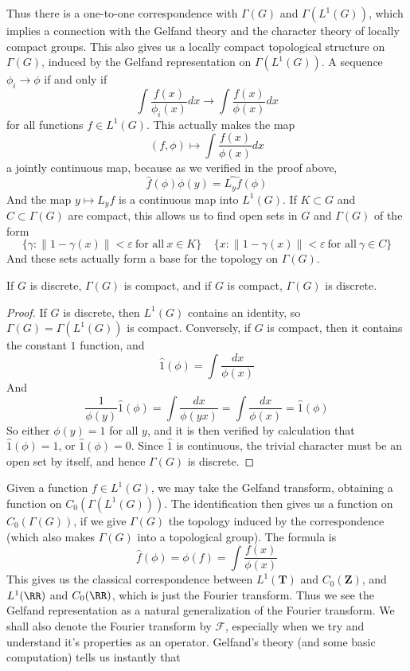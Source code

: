 Thus there is a one-to-one correspondence with $\Gamma(G)$ and $\Gamma(L^1(G))$, which implies a connection with the Gelfand theory and the character theory of locally compact groups. This also gives us a locally compact topological structure on $\Gamma(G)$, induced by the Gelfand representation on $\Gamma(L^1(G))$. A sequence $\phi_i \to \phi$ if and only if
%
\[ \int \frac{f(x)}{\phi_i(x)} dx \to \int \frac{f(x)}{\phi(x)} dx \]
%
for all functions $f \in L^1(G)$. This actually makes the map
%
\[ (f,\phi) \mapsto \int \frac{f(x)}{\phi(x)} dx \]
%
a jointly continuous map, because as we verified in the proof above,
%
\[ \widehat{f}(\phi) \phi(y) = \widehat{L_y f}(\phi) \]
%
And the map $y \mapsto L_y f$ is a continuous map into $L^1(G)$. If $K \subset G$ and $C \subset \Gamma(G)$ are compact, this allows us to find open sets in $G$ and $\Gamma(G)$ of the form
%
\[ \{ \gamma : \| 1 - \gamma(x) \| < \varepsilon\ \text{for all}\ x \in K \}\ \ \ \ \ \{ x : \| 1 - \gamma(x) \| < \varepsilon\ \text{for all}\ \gamma \in C \} \]
%
And these sets actually form a base for the topology on $\Gamma(G)$.

\begin{theorem}
    If $G$ is discrete, $\Gamma(G)$ is compact, and if $G$ is compact, $\Gamma(G)$ is discrete.
\end{theorem}
\begin{proof}
    If $G$ is discrete, then $L^1(G)$ contains an identity, so $\Gamma(G) = \Gamma(L^1(G))$ is compact. Conversely, if $G$ is compact, then it contains the constant $1$ function, and
    \[ \widehat{1}(\phi) = \int \frac{dx}{\phi(x)} \]
    And
    \[ \frac{1}{\phi(y)} \widehat{1}(\phi) = \int \frac{dx}{\phi(yx)} = \int \frac{dx}{\phi(x)} = \hat{1}(\phi) \]
    So either $\phi(y) = 1$ for all $y$, and it is then verified by calculation that $\widehat{1}(\phi) = 1$, or $\widehat{1}(\phi) = 0$. Since $\widehat{1}$ is continuous, the trivial character must be an open set by itself, and hence $\Gamma(G)$ is discrete.
\end{proof}

Given a function $f \in L^1(G)$, we may take the Gelfand transform, obtaining a function on $C_0(\Gamma(L^1(G)))$. The identification then gives us a function on $C_0(\Gamma(G))$, if we give $\Gamma(G)$ the topology induced by the correspondence (which also makes $\Gamma(G)$ into a topological group). The formula is
%
\[ \widehat{f}(\phi) = \phi(f) = \int \frac{f(x)}{\phi(x)} \]
%
This gives us the classical correspondence between $L^1(\mathbf{T})$ and $C_0(\mathbf{Z})$, and $L^1(\RR)$ and $C_0(\RR)$, which is just the Fourier transform. Thus we see the Gelfand representation as a natural generalization of the Fourier transform. We shall also denote the Fourier transform by $\mathcal{F}$, especially when we try and understand it's properties as an operator. Gelfand's theory (and some basic computation) tells us instantly that

